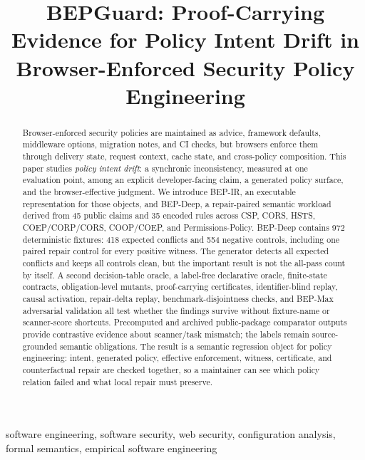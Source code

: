 \documentclass[10pt,conference]{IEEEtran}
\newcommand{\bep}{BEP-IR}
\begin{document}
\title{BEPGuard: Proof-Carrying Evidence for Policy Intent Drift in Browser-Enforced Security Policy Engineering}
\author{}
\maketitle

\begin{abstract}
Browser-enforced security policies are maintained as advice, framework defaults, middleware options, migration notes, and CI checks, but browsers enforce them through delivery state, request context, cache state, and cross-policy composition. This paper studies \emph{policy intent drift}: a synchronic inconsistency, measured at one evaluation point, among an explicit developer-facing claim, a generated policy surface, and the browser-effective judgment. We introduce \bep, an executable representation for those objects, and BEP-Deep, a repair-paired semantic workload derived from 45 public claims and 35 encoded rules across CSP, CORS, HSTS, COEP/CORP/CORS, COOP/COEP, and Permissions-Policy. BEP-Deep contains 972 deterministic fixtures: 418 expected conflicts and 554 negative controls, including one paired repair control for every positive witness. The generator detects all expected conflicts and keeps all controls clean, but the important result is not the all-pass count by itself. A second decision-table oracle, a label-free declarative oracle, finite-state contracts, obligation-level mutants, proof-carrying certificates, identifier-blind replay, causal activation, repair-delta replay, benchmark-disjointness checks, and BEP-Max adversarial validation all test whether the findings survive without fixture-name or scanner-score shortcuts. Precomputed and archived public-package comparator outputs provide contrastive evidence about scanner/task mismatch; the labels remain source-grounded semantic obligations. The result is a semantic regression object for policy engineering: intent, generated policy, effective enforcement, witness, certificate, and counterfactual repair are checked together, so a maintainer can see which policy relation failed and what local repair must preserve.
\end{abstract}

\begin{IEEEkeywords}
software engineering, software security, web security, configuration analysis, formal semantics, empirical software engineering
\end{IEEEkeywords}
\end{document}
